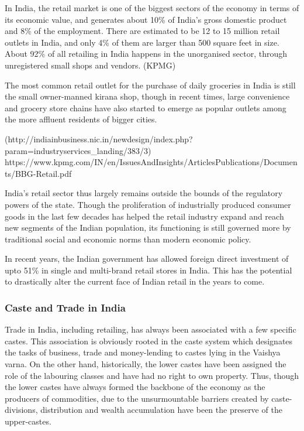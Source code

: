 \documentclass[]{article}
\begin{document}
In India, the retail market is one of the biggest sectors of the economy
in terms of its economic value, and generates about 10\% of India's
gross domestic product and 8\% of the employment. There are estimated to
be 12 to 15 million retail outlets in India, and only 4\% of them are
larger than 500 square feet in size. About 92\% of all retailing in
India happens in the unorganised sector, through unregistered small
shops and vendors. (KPMG)

The most common retail outlet for the purchase of daily groceries in
India is still the small owner-manned kirana shop, though in recent
times, large convenience and grocery store chains have also started to
emerge as popular outlets among the more affluent residents of bigger
cities.

(http://indiainbusiness.nic.in/newdesign/index.php?param=industryservices\_landing/383/3)
https://www.kpmg.com/IN/en/IssuesAndInsights/ArticlesPublications/Documents/BBG-Retail.pdf

India's retail sector thus largely remains outside the bounds of the
regulatory powers of the state. Though the proliferation of industrially
produced consumer goods in the last few decades has helped the retail
industry expand and reach new segments of the Indian population, its
functioning is still governed more by traditional social and economic
norms than modern economic policy.

In recent years, the Indian government has allowed foreign direct
investment of upto 51\% in single and multi-brand retail stores in
India. This has the potential to drastically alter the current face of
Indian retail in the years to come.

\subsubsection{Caste and Trade in India}\label{caste-and-trade-in-india}

Trade in India, including retailing, has always been associated with a
few specific castes. This association is obviously rooted in the caste
system which designates the tasks of business, trade and money-lending
to castes lying in the Vaishya varna. On the other hand, historically,
the lower castes have been assigned the role of the labouring classes
and have had no right to own property. Thus, though the lower castes
have always formed the backbone of the economy as the producers of
commodities, due to the unsurmountable barriers created by
caste-divisions, distribution and wealth accumulation have been the
preserve of the upper-castes.
\end{document}
